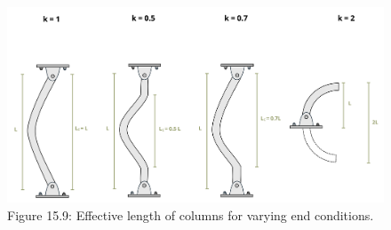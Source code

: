 \documentclass[
  letterpaper,
  DIV=11,
  numbers=noendperiod]{scrreprt}
\begin{document}
\begin{figure}[H]

{\centering \includegraphics{images/CH15s PNGs/figure 15.9.png}

}

\caption{Figure 15.9: Effective length of columns for varying end
conditions.}

\end{figure}%
\end{document}
